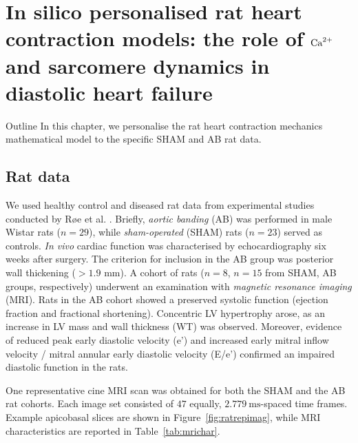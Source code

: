 \chapter{In silico personalised rat heart contraction models: the role of $\textrm{Ca}^{2+}$ 
and sarcomere dynamics in diastolic heart failure}\label{cha:chapter4}
%
%
%
\begin{remark}{Outline}
    In this chapter, we personalise the rat heart contraction mechanics mathematical model to the specific SHAM and AB rat data.
\end{remark}


%
%
%
\section{Rat data}
We used healthy control and diseased rat data from experimental studies conducted by R{\o}e et al. \cite{Roe:2017}. Briefly, \textit{aortic banding} (\acs{AB}) was performed in male Wistar rats ($n=29$), while \textit{sham-operated} (\acs{SHAM}) rats ($n=23$) served as controls. \textit{In vivo} cardiac function was characterised by echocardiography six weeks after surgery. The criterion for inclusion in the AB group was posterior wall thickening ($>1.9$ mm). A cohort of rats ($n=8$, $n=15$ from SHAM, AB groups, respectively) underwent an examination with \textit{magnetic resonance imaging} (\acs{MRI}). Rats in the AB cohort showed a preserved systolic function (ejection fraction and fractional shortening). Concentric LV hypertrophy arose, as an increase in LV mass and wall thickness (WT) was observed. Moreover, evidence of reduced peak early diastolic velocity (e’) and increased early mitral inflow velocity / mitral annular early diastolic velocity (E/e’) confirmed an impaired diastolic function in the rats.

\vspace{0.2cm}
One representative cine MRI scan was obtained for both the SHAM and the AB rat cohorts. Each image set consisted of $47$ equally, $\SI{2.779}{\milli\second}$-spaced time frames. Example apicobasal slices are shown in Figure~\ref{fig:ratrepimag}, while MRI characteristics are reported in Table~\ref{tab:mrichar}.

